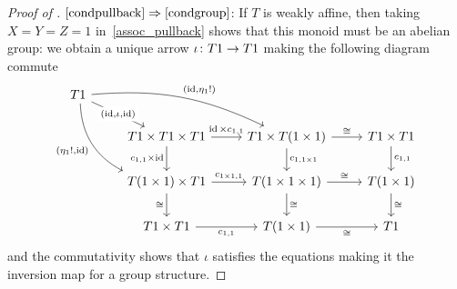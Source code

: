 \documentclass[a4paper,UKenglish,numberwithinsect,cleveref, autoref, thm-restate]{lipics-v2021}
\theoremstyle{plain} %
\theoremstyle{definition} %
\begin{document}
\begin{proof}[Proof of ]
 $\ref{condpullback}\Rightarrow\ref{condgroup}$:
 If $T$ is weakly affine, then taking $X = Y = Z = 1$ in~\eqref{assoc_pullback} shows that this monoid must be an abelian group: we obtain a unique arrow $\iota \colon T1 \to T1$ making the following diagram commute
	\[
		\begin{tikzcd}
			T1 \ar{dr}[description]{(\id,\iota,\id)} \ar[bend left=15]{drr}{(\id,\eta_1 !)} \ar[bend right,swap]{ddr}{(\eta_1 !,\id)} \\
			&	T1 \times T1 \times T1 \ar{r}{\id \times c_{1,1}} \ar[swap]{d}{c_{1,1} \times \id}	& T1 \times T(1\times 1) \ar{d}{c_{1,1\times 1}} \ar{r}{\cong} & T1\times T1 \ar{d}{c_{1,1}}	\\
			&	T(1\times 1) \times T1 \ar{r}{c_{1\times 1,1}} \ar{d}[swap]{\cong}	& T(1\times 1\times 1) \ar{d}{\cong} \ar{r}{\cong} & T(1\times 1) \ar{d}{\cong} \\
			& T1\times T1 \ar{r}[swap]{c_{1,1}} & T(1\times 1) \ar{r}[swap]{\cong} & T1
		\end{tikzcd}
	\]
	and the commutativity shows that $\iota$ satisfies the equations making it the inversion map for a group structure.
\end{proof}
\end{document}
